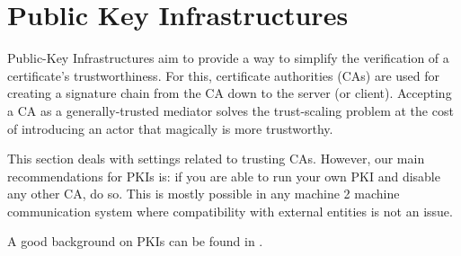 \section{Public Key Infrastructures}
\label{section:PKIs}

Public-Key Infrastructures aim to provide a way to simplify the verification of
a certificate's trustworthiness.  For this, certificate authorities (CAs) are
used for creating a signature chain from the CA down to the server (or client).
Accepting a CA as a generally-trusted mediator solves the trust-scaling problem
at the cost of introducing an actor that magically is more trustworthy.

This section deals with settings related to trusting CAs.  However, our main
recommendations for PKIs is: if you are able to run your own PKI and disable
any other CA, do so.  This is mostly possible in any machine 2 machine
communication system where compatibility with external entities is not an issue.

A good background on PKIs can be found in .



